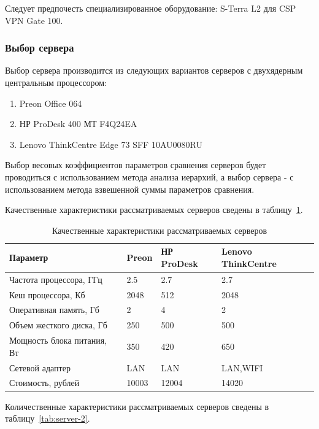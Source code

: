 \documentclass[russian,utf8,emptystyle]{eskdtext}
\begin{document}
Следует предпочесть специализированное оборудование: S-Terra L2 для CSP VPN Gate 100.

\clearpage
\subsubsection{Выбор сервера}
Выбор сервера производится из следующих вариантов серверов с двухядерным центральным процессором:
\begin{enumerate}[label=\arabic*.]
\item Preon Office 064
\item НР ProDesk 400 МТ F4Q24EA
\item Lenovo ThinkCentre Edge 73 SFF 10AU0080RU
\end{enumerate}

Выбор весовых коэффициентов параметров сравнения серверов будет проводиться с использованием метода анализа иерархий, а выбор сервера - с использованием метода взвешенной суммы параметров сравнения.

Качественные характеристики рассматриваемых серверов сведены в таблицу~\ref{tab:server-1}.

\begin{longtable}{p{7cm}|p{2cm}|p{2cm}|p{2cm}}
\caption{Качественные характеристики рассматриваемых серверов}
\label{tab:server-1} \\
Параметр                     & Preon      & НР ProDesk & Lenovo ThinkCentre \\ 
\hline 
Частота процессора, ГГц      & 2.5        & 2.7        & 2.7      \\ 
Кеш процессора, Кб           & 2048       & 512        & 2048     \\
Оперативная память, Гб       & 2          & 4          & 2        \\ 
Объем жесткого диска, Гб     & 250        & 500        & 500      \\ 
Мощность блока питания, Вт   & 350        & 420        & 650      \\ 
Сетевой адаптер              & LAN        & LAN        & LAN,WIFI \\ 
Стоимость, рублей            & 10003      & 12004      & 14020    \\
\end{longtable}

Количественные характеристики рассматриваемых серверов сведены в таблицу~\ref{tab:server-2}.
\end{document}

